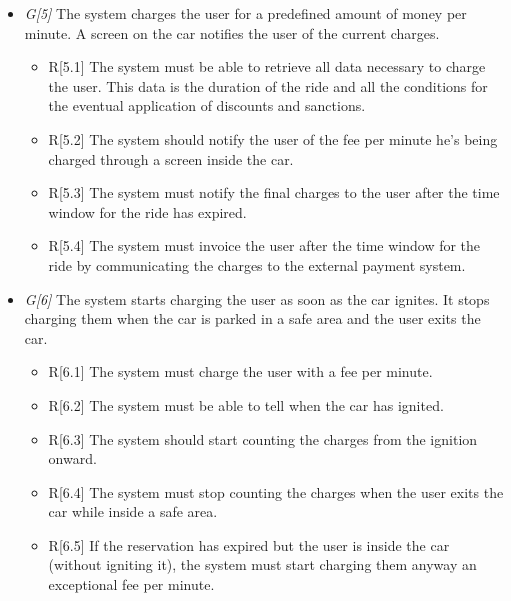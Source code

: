 \begin{itemize}
				\item \textit{G[5]} The system charges the user for a predefined amount of money per minute. A screen on the car notifies the user of the current charges.
					\begin{itemize}
						\item R[5.1] The system must be able to retrieve all data necessary to charge the user. This data is the duration of the ride and all the conditions for the eventual application of discounts and sanctions.
						\item R[5.2] The system should notify the user of the fee per minute he's being charged through a screen inside the car.
						\item R[5.3] The system must notify the final charges to the user after the time window for the ride has expired.
						\item R[5.4] The system must invoice the user after the time window for the ride by communicating the charges to the external payment system. 
						
					\end{itemize}
				
				\item \textit{G[6]} The system starts charging the user as soon as the car ignites. It stops charging them when the car is parked in a safe area and the user exits the car.
					\begin{itemize}
						\item R[6.1] The system must charge the user with a fee per minute.
						\item R[6.2] The system must be able to tell when the car has ignited. 
						\item R[6.3] The system should start counting the charges from the ignition onward. %
						\item R[6.4] The system must stop counting the charges when the user exits the car while inside a safe area.
						\item R[6.5] If the reservation has expired but the user is inside the car (without igniting it), the system must start charging them anyway an exceptional fee per minute. %
					\end{itemize}
					

\end{itemize}
